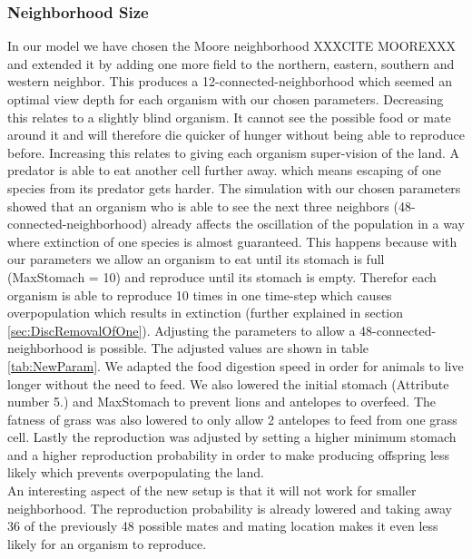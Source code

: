 \documentclass[11pt]{article}
\begin{document}
\subsubsection{Neighborhood Size}
\label{sec:DiscNeighbourhood}
In our model we have chosen the Moore neighborhood XXXCITE MOOREXXX and extended it by adding one more field to the northern, eastern, southern and western neighbor. This produces a 12-connected-neighborhood which seemed an optimal view depth for each organism with our chosen parameters. Decreasing this relates to a slightly blind organism. It cannot see the possible food or mate around it and will therefore die quicker of hunger without being able to reproduce before. Increasing this relates to giving each organism super-vision of the land. A predator is able to eat another cell further away. which means escaping of one species from its predator gets harder. The simulation with our chosen parameters showed that an organism who is able to see the next three neighbors (48-connected-neighborhood) already affects the oscillation of the population in a way where extinction of one species is almost guaranteed. This happens because with our parameters we allow an organism to eat until its stomach is full (MaxStomach = 10) and reproduce until its stomach is empty. Therefor each organism is able to reproduce 10 times in one time-step which causes overpopulation which results in extinction (further explained in section \ref{sec:DiscRemovalOfOne}). Adjusting the parameters to allow a 48-connected-neighborhood is possible. The adjusted values are shown in table \ref{tab:NewParam}. We adapted the food digestion speed in order for animals to live longer without the need to feed. We also lowered the initial stomach (Attribute number 5.) and MaxStomach to prevent lions and antelopes to overfeed. The fatness of grass was also lowered to only allow 2 antelopes to feed from one grass cell. Lastly the reproduction was adjusted by setting a higher minimum stomach and a higher reproduction probability in order to make producing offspring less likely which prevents overpopulating the land.\\
An interesting aspect of the new setup is that it will not work for smaller neighborhood. The reproduction probability is already lowered and taking away 36 of the previously 48 possible mates and mating location makes it even less likely for an organism to reproduce. 
\end{document}
